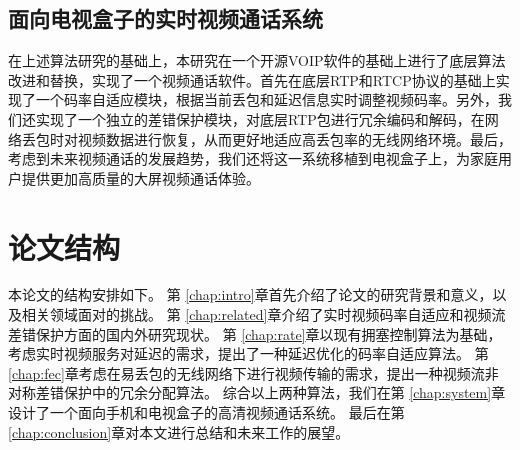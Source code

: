 \subsection{面向电视盒子的实时视频通话系统}
在上述算法研究的基础上，本研究在一个开源VOIP软件的基础上进行了底层算法改进和替换，实现了一个视频通话软件。首先在底层RTP和RTCP协议的基础上实现了一个码率自适应模块，根据当前丢包和延迟信息实时调整视频码率。另外，我们还实现了一个独立的差错保护模块，对底层RTP包进行冗余编码和解码，在网络丢包时对视频数据进行恢复，从而更好地适应高丢包率的无线网络环境。最后，考虑到未来视频通话的发展趋势，我们还将这一系统移植到电视盒子上，为家庭用户提供更加高质量的大屏视频通话体验。

\section{论文结构}
本论文的结构安排如下。
第 \ref{chap:intro}章首先介绍了论文的研究背景和意义，以及相关领域面对的挑战。
第 \ref{chap:related}章介绍了实时视频码率自适应和视频流差错保护方面的国内外研究现状。
第 \ref{chap:rate}章以现有拥塞控制算法为基础，考虑实时视频服务对延迟的需求，提出了一种延迟优化的码率自适应算法。
第 \ref{chap:fec}章考虑在易丢包的无线网络下进行视频传输的需求，提出一种视频流非对称差错保护中的冗余分配算法。
综合以上两种算法，我们在第 \ref{chap:system}章设计了一个面向手机和电视盒子的高清视频通话系统。
最后在第 \ref{chap:conclusion}章对本文进行总结和未来工作的展望。
